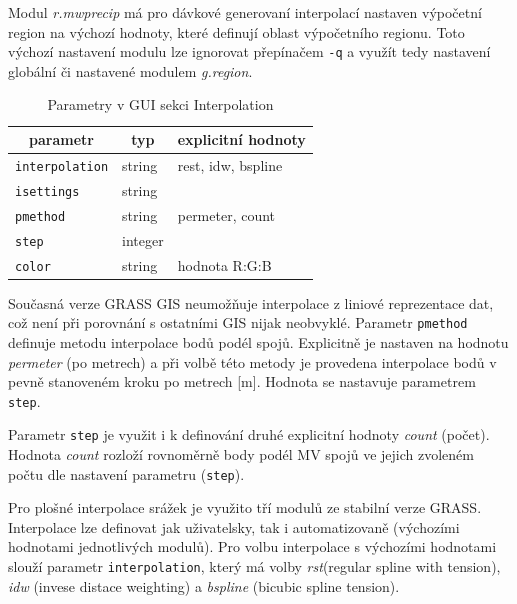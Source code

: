 \documentclass[a4paper,12pt,oneside]{report}
\begin{document}
Modul \textit{r.mwprecip} má pro dávkové generovaní interpolací 
nastaven výpočetní region na výchozí hodnoty, které definují oblast
výpočetního regionu. Toto výchozí nastavení modulu lze ignorovat přepínačem \texttt{-q}
a využít tedy nastavení globální či nastavené modulem \textit{g.region}.
\begin{table}[h]
\centering
\begin{tabular}{|lll|}
\hline
\multicolumn{1}{|c}{parametr} & \multicolumn{1}{c}{typ} & \multicolumn{1}{c|}{explicitní hodnoty} \\ \hline\hline
{\tt interpolation}                          & string                  & rest, idw, bspline           \\
{\tt isettings}                              & string                  &                              \\
{\tt pmethod}                                & string                  & permeter, count              \\
{\tt step}                                   & integer                 &                              \\
{\tt color}                                  & string                  & hodnota R:G:B                \\ \hline
\end{tabular}
\caption{Parametry v GUI sekci Interpolation}
\end{table}
Současná verze GRASS GIS neumožňuje interpolace z liniové reprezentace
dat, což není při porovnání s ostatními GIS nijak neobvyklé. Parametr
\texttt{pmethod} definuje metodu interpolace bodů podél
spojů. Explicitně je nastaven na hodnotu \emph{permeter} (po metrech)
a při volbě této metody je provedena interpolace bodů v pevně
stanoveném kroku po metrech [m]. Hodnota se nastavuje parametrem
\texttt{step}.

Parametr \texttt{step} je využit i k definování druhé explicitní
hodnoty \emph{count} (počet). Hodnota \emph{count} rozloží rovnoměrně
body podél MV spojů ve jejich zvoleném počtu dle nastavení parametru
(\texttt{step}).

Pro plošné interpolace srážek je využito tří modulů ze stabilní verze
GRASS. Interpolace lze definovat jak uživatelsky, tak i automatizovaně
(výchozími hodnotami jednotlivých modulů). Pro volbu interpolace s
výchozími hodnotami slouží parametr \texttt{interpolation}, který má
volby \emph{rst}(regular spline with tension), \emph{idw} (invese
distace weighting) a \emph{bspline} (bicubic spline tension).
\end{document}
